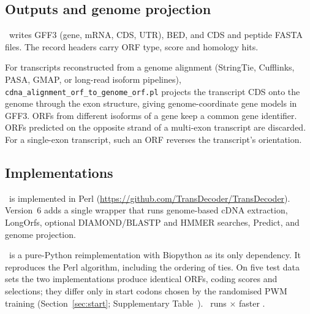 \subsection{Outputs and genome projection}
\TD\ writes GFF3 (gene, mRNA, CDS, UTR), BED, and CDS and peptide FASTA files. The record headers
carry ORF type, score and homology hits.

For transcripts reconstructed from a genome alignment (StringTie, Cufflinks, PASA, GMAP, or
long-read isoform pipelines), \texttt{cdna\_alignment\_orf\_to\_genome\_orf.pl} projects the
transcript CDS onto the genome through the exon structure, giving genome-coordinate gene models in
GFF3. ORFs from different isoforms of a gene keep a common gene identifier. ORFs predicted on the
opposite strand of a multi-exon transcript are discarded. For a single-exon transcript, such an ORF
reverses the transcript's orientation.

\subsection{Implementations}
\label{sec:impl}
\TD\ is implemented in Perl (\url{https://github.com/TransDecoder/TransDecoder}). Version~6 adds a
single wrapper that runs genome-based cDNA extraction, LongOrfs, optional DIAMOND/BLASTP and
HMMER searches, Predict, and genome projection.

\PyTD\ is a pure-Python reimplementation with Biopython as its only dependency. It reproduces the
Perl algorithm, including the ordering of ties. On five test data sets the two implementations
produce identical ORFs, coding scores and selections; they differ only in start codons chosen by the
randomised PWM training (Section~\ref{sec:start}; Supplementary Table~). \PyTD\ runs
$\times$ faster .
